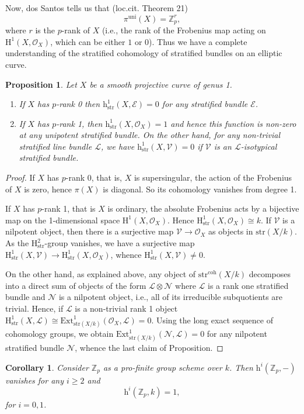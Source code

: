 \documentclass[12pt,a4]{amsart}
\newtheorem{cor}[claim]{Corollary}
\newtheorem{prop}[claim]{Proposition}
\theoremstyle{definition}
\begin{document}
Now, dos Santos tells us that (loc.cit. Theorem 21)
$$\pi^\mathrm{uni}(X)=\mathbb Z_p^r,$$
where $r$ is the $p$-rank of $X$ (i.e., the rank of the Frobenius map acting on 
$\mathrm{H}^1(X,\mathcal O_X)$, which can be either $1$ or $0$). 
Thus we have a complete understanding of the stratified cohomology of stratified bundles on an elliptic curve.
\begin{prop}\label{prop_vanishing_elliptic}
Let $X$ be a smooth projective curve of genus 1. 
\begin{enumerate}
\item If $X$ has $p$-rank 0 then $\mathrm{h}^1_\mathrm{str}(X,\mathcal E)=0$ for any
stratified bundle $\mathcal E$. 
\item If $X$ has $p$-rank 1, then $\mathrm{h}^1_\mathrm{str}(X,\mathcal O_X)=1$ and hence this function is non-zero at any unipotent stratified bundle. On the other hand,
for any non-trivial stratified line bundle $\mathcal L$, we have $\mathrm{h}^1_\mathrm{str}(X,\mathcal V)=0$ if $\mathcal V$ is an $\mathcal L$-isotypical stratified bundle.
\end{enumerate}
\end{prop}
\begin{proof}
If $X$ has $p$-rank 0, that is, $X$ is supersingular, the action of the Frobenius of $X$ is zero,
hence  $\pi(X)$ is diagonal. So its cohomology vanishes from degree 1. 
 
If $X$ has $p$-rank 1, that is $X$ is ordinary, the absolute Frobenius acts by a bijective map
on the 1-dimensional space $\mathrm{H}^1(X,\mathcal O_X)$. 
Hence $\mathrm{H}^1_\mathrm{str}(X,\mathcal O_X)\cong k$. If $\mathcal V$ is a nilpotent object, then there is a surjective map $\mathcal V\longrightarrow \mathcal O_X$ as objects in $\mathrm{str}(X/k)$. As the $\mathrm{H}^2_\mathrm{str}$-group vanishes, we have
a surjective map $\mathrm{H}^1_\mathrm{str}(X,\mathcal V)\longrightarrow 
\mathrm{H}^1_\mathrm{str}(X,\mathcal O_X)$, whence $\mathrm{H}^1_\mathrm{str}(X,\mathcal V)\neq 0$.

On the other hand, as explained above, any object of $\mathrm{str}^\mathrm{coh}(X/k)$ decomposes
into a direct sum of objects of the form
$\mathcal L\otimes\mathcal  N$
where $\mathcal L$ is a rank one stratified bundle and $\mathcal N$ is a nilpotent
object, i.e., all of its irreducible subquotients
are trivial. Hence, if  $\mathcal L$ is a non-trivial rank 1 object
$\mathrm{H}^1_\mathrm{str}(X,\mathcal L)\cong 
\mathrm{Ext}^1_{\mathrm{str}(X/k)}(\mathcal O_X,\mathcal L)=0.$
Using the long exact sequence of cohomology groups, we obtain 
$\mathrm{Ext}^1_{\mathrm{str}(X/k)}(\mathcal N,\mathcal L)=0$ for any nilpotent stratified bundle
$\mathcal N$, whence the last claim of Proposition. 
\end{proof}
\begin{cor}
Consider $\mathbb Z_p$ as a pro-finite group scheme over $k$. Then 
$\mathrm{h}^i(\mathbb Z_p, -)$ vanishes for any $i\geq 2$ and
$$\mathrm{h}^i(\mathbb Z_p, k)=1,$$
for $i=0,1$.  
\end{cor}
\end{document}
